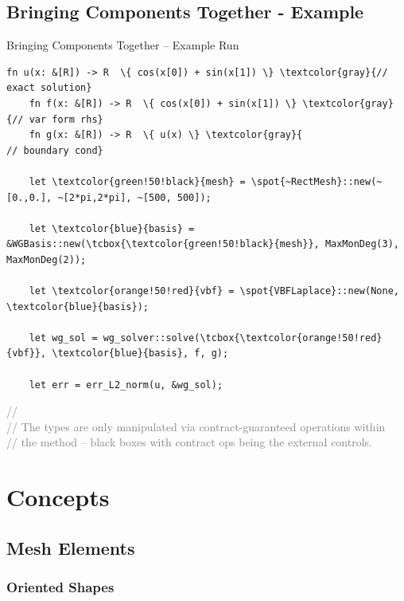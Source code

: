 \documentclass{beamer}
\begin{document}
\subsection{Bringing Components Together - Example}

\begin{frame}[fragile]{Bringing Components Together -- Example Run}
  \begin{Verbatim}[gobble=4, commandchars=\\\{\}, fontsize=\small, fontfamily=tt]
    fn u(x: &[R]) -> R  \{ cos(x[0]) + sin(x[1]) \} \textcolor{gray}{// exact solution}
    fn f(x: &[R]) -> R  \{ cos(x[0]) + sin(x[1]) \} \textcolor{gray}{// var form rhs}
    fn g(x: &[R]) -> R  \{ u(x) \} \textcolor{gray}{                 // boundary cond}

    let \textcolor{green!50!black}{mesh} = \spot{~RectMesh}::new(~[0.,0.], ~[2*pi,2*pi], ~[500, 500]);

    let \textcolor{blue}{basis} = &WGBasis::new(\tcbox{\textcolor{green!50!black}{mesh}}, MaxMonDeg(3), MaxMonDeg(2));

    let \textcolor{orange!50!red}{vbf} = \spot{VBFLaplace}::new(None, \textcolor{blue}{basis});

    let wg_sol = wg_solver::solve(\tcbox{\textcolor{orange!50!red}{vbf}}, \textcolor{blue}{basis}, f, g);

    let err = err_L2_norm(u, &wg_sol);
  \end{Verbatim}
  \footnotesize {
    \textcolor{gray}{// }\\
    \textcolor{gray}{// The types are only manipulated via contract-guaranteed operations within\\
      // the method -- black boxes with contract ops being the external controls.}
  }
\end{frame}

\section{Concepts}

\subsection{Mesh Elements}

\subsubsection{Oriented Shapes}
\end{document}
